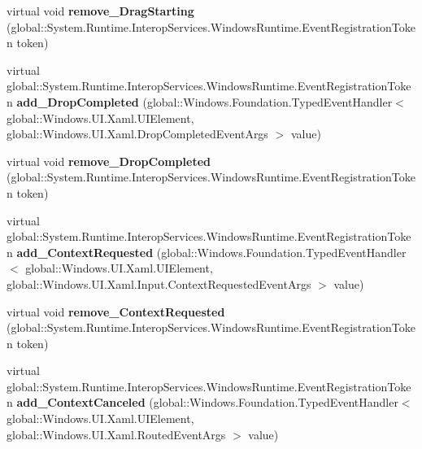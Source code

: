 \begin{DoxyCompactItemize}
\item 
\mbox{\label{class_windows_1_1_u_i_1_1_xaml_1_1_u_i_element_ae2df4eabbc6b1dbc7a5a85a0866f4fba}} 
virtual void {\bfseries remove\+\_\+\+Drag\+Starting} (global\+::\+System.\+Runtime.\+Interop\+Services.\+Windows\+Runtime.\+Event\+Registration\+Token token)
\item 
\mbox{\label{class_windows_1_1_u_i_1_1_xaml_1_1_u_i_element_a55d6a19a803c9584cc9a54e02eb240aa}} 
virtual global\+::\+System.\+Runtime.\+Interop\+Services.\+Windows\+Runtime.\+Event\+Registration\+Token {\bfseries add\+\_\+\+Drop\+Completed} (global\+::\+Windows.\+Foundation.\+Typed\+Event\+Handler$<$ global\+::\+Windows.\+U\+I.\+Xaml.\+U\+I\+Element, global\+::\+Windows.\+U\+I.\+Xaml.\+Drop\+Completed\+Event\+Args $>$ value)
\item 
\mbox{\label{class_windows_1_1_u_i_1_1_xaml_1_1_u_i_element_a175ef186f4de5c6a422a88d8f42588e3}} 
virtual void {\bfseries remove\+\_\+\+Drop\+Completed} (global\+::\+System.\+Runtime.\+Interop\+Services.\+Windows\+Runtime.\+Event\+Registration\+Token token)
\item 
\mbox{\label{class_windows_1_1_u_i_1_1_xaml_1_1_u_i_element_af82e90640323c9da8621013a558c87f1}} 
virtual global\+::\+System.\+Runtime.\+Interop\+Services.\+Windows\+Runtime.\+Event\+Registration\+Token {\bfseries add\+\_\+\+Context\+Requested} (global\+::\+Windows.\+Foundation.\+Typed\+Event\+Handler$<$ global\+::\+Windows.\+U\+I.\+Xaml.\+U\+I\+Element, global\+::\+Windows.\+U\+I.\+Xaml.\+Input.\+Context\+Requested\+Event\+Args $>$ value)
\item 
\mbox{\label{class_windows_1_1_u_i_1_1_xaml_1_1_u_i_element_a41e65f1fea8389643eabe21d9861a727}} 
virtual void {\bfseries remove\+\_\+\+Context\+Requested} (global\+::\+System.\+Runtime.\+Interop\+Services.\+Windows\+Runtime.\+Event\+Registration\+Token token)
\item 
\mbox{\label{class_windows_1_1_u_i_1_1_xaml_1_1_u_i_element_a10d84028f6f428f4a5c1fe8fe9501deb}} 
virtual global\+::\+System.\+Runtime.\+Interop\+Services.\+Windows\+Runtime.\+Event\+Registration\+Token {\bfseries add\+\_\+\+Context\+Canceled} (global\+::\+Windows.\+Foundation.\+Typed\+Event\+Handler$<$ global\+::\+Windows.\+U\+I.\+Xaml.\+U\+I\+Element, global\+::\+Windows.\+U\+I.\+Xaml.\+Routed\+Event\+Args $>$ value)

\end{DoxyCompactItemize}
